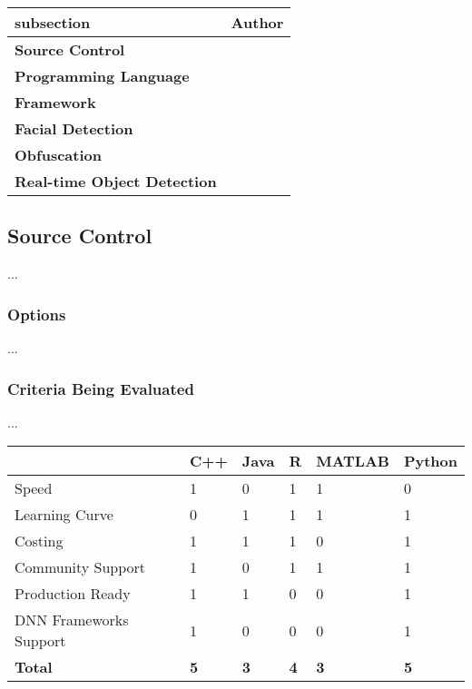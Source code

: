\begin{center}
  \begin{tabular}{ | l | p{10cm} | } 
    \hline \textbf{subsection} & \textbf{Author} \\ \hline
    \textbf{Source Control} & \callian{} \\ \hline
    \textbf{Programming Language} & \callmazen{} \\ \hline
    \textbf{Framework} & \callmazen{} \\ \hline
    \textbf{Facial Detection} & \callsteph{} \\ \hline
    \textbf{Obfuscation} & \callian{} \\ \hline
    \textbf{Real-time Object Detection} & \callmiles{}\\ \hline
  \end{tabular}
\end{center}

\subsection{Source Control}
...
\subsubsection{Options}
...

\subsubsection{Criteria Being Evaluated}
...

\begin{center}
\begin{tabular}{|l|l|l|l|l|l|}
\hline
           & \textbf{C++} & \textbf{Java} & \textbf{R} & \textbf{MATLAB} & \textbf{Python}\\ \hline
Speed &     1      &      0     &      1     &      1     & 0          \\ \hline
Learning Curve &     0      &     1      &      1     &     1      &    1       \\ \hline
Costing &     1      &     1      &     1      &    0       &       1    \\ \hline
Community Support &      1     &     0      &   1        &      1     &     1      \\ \hline
Production Ready &     1      &     1      &    0       &       0    &      1     \\ \hline
DNN Frameworks Support &     1      &      0     &     0      &        0   &   1        \\ \hline
\textbf{Total} &      \textbf{5}     &   \textbf{3}        &      \textbf{4}     &     \textbf{3}      &    \textbf{5}       \\ \hline
\end{tabular}
\end{center}

